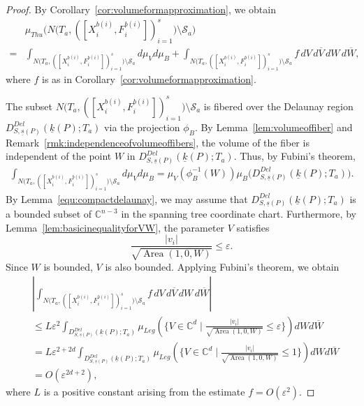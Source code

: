 \documentclass{compositio}
\numberwithin{equation}{section}
\numberwithin{figure}{section}
\theoremstyle{definition}
\theoremstyle{plain}
\begin{document}
{\begin{proof}
    By Corollary~\ref{cor:volumeformapproximation}, we obtain
    \begin{align*}
         &\mu_{Thu}\big(N\big(T_a, ([X_i^{b(i)}, F_i^{b(i)}])_{i=1}^s\big) \setminus \mathcal{S}_a\big)\\ 
         =& \int_{N\big(T_a, ([X_i^{b(i)}, F_i^{b(i)}])_{i=1}^s\big) \setminus \mathcal{S}_a}d\mu_{V}d\mu_B
        +
        \int_{N\big(T_a, ([X_i^{b(i)}, F_i^{b(i)}])_{i=1}^s\big) \setminus \mathcal{S}_a} f \, dV \, d\overline{V} \, dW \, d\overline{W},
    \end{align*}
    where $f$ is as in Corollary~\ref{cor:volumeformapproximation}.
    
    The subset $N\big(T_a, ([X_i^{b(i)}, F_i^{b(i)}])_{i=1}^s\big) \setminus \mathcal{S}_a$ is fibered over the Delaunay region $D_{S,\underline{s}(P)}^{Del}(\underline{k}(P);T_a)$ via the projection $\phi_B$. By Lemma~\ref{lem:volumeoffiber} and Remark~\ref{rmk:independenceofvolumeoffibers}, the volume of the fiber is independent of the point $W$ in $D_{S,\underline{s}(P)}^{Del}(\underline{k}(P);T_a)$. Thus, by Fubini's theorem,
    \begin{align*}
        \int_{N\big(T_a, ([X_i^{b(i)}, F_i^{b(i)}])_{i=1}^s\big) \setminus \mathcal{S}_a}d\mu_{V}d\mu_B = \mu_V\left(\phi_B^{-1}(W)\right) \mu_{B}\big(D_{S,\underline{s}(P)}^{Del}(\underline{k}(P);T_a)\big).
    \end{align*}
    By Lemma~\ref{equ:compactdelaunay}, we may assume that $D_{S,\underline{s}(P)}^{Del}(\underline{k}(P);T_a)$ is a bounded subset of $\mathbb{C}^{n-3}$ in the spanning tree coordinate chart. Furthermore, by Lemma~\ref{lem:basicinequalityforVW}, the parameter $V$ satisfies
    $$
    \frac{|v_i|}{\sqrt{\operatorname{Area}(1,0,W)}} \leq \varepsilon.
    $$
    Since $W$ is bounded, $V$ is also bounded. Applying Fubini’s theorem, we obtain
    \begin{align*}
        &\left|\int_{N\big(T_a, ([X_i^{b(i)}, F_i^{b(i)}])_{i=1}^s\big) \setminus \mathcal{S}_a} f \, dV \, d\overline{V} \, dW \, d\overline{W} \right|\\ 
        &\le L\varepsilon^2\int_{D_{S,\underline{s}(P)}^{Del}(\underline{k}(P);T_a)}\mu_{Leg}
        \left(\Big\{V\in \mathbb{C}^d\mid\frac{|v_i|}{\sqrt{\operatorname{Area}(1,0,W)}} \leq \varepsilon\Big\}\right)
        dW d\overline{W}\\
        &= L\varepsilon^{2+2d}\int_{D_{S,\underline{s}(P)}^{Del}(\underline{k}(P);T_a)}\mu_{Leg}
        \left(\Big\{V\in \mathbb{C}^d\mid\frac{|v_i|}{\sqrt{\operatorname{Area}(1,0,W)}} \leq 1\Big\}\right)
        dW d\overline{W}\\
        &= O(\varepsilon^{2d + 2}),
    \end{align*}
    where $L$ is a positive constant arising from the estimate
    $f = O(\varepsilon^2)$.


\end{proof}}
\end{document}
